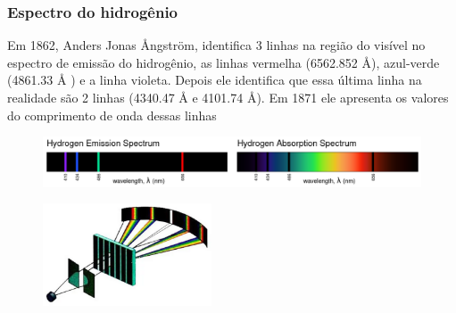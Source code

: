\documentclass[12pt,brazil]{beamer}
\begin{document}

\begin{frame}
  \frametitle{Espectro do hidrogênio}

  \begin{multicols}{2}
    \begin{minipage}[b][20ex][t]{\linewidth}
    \vspace*{0.5cm}
        \fontsize{9pt}{11pt}\selectfont
      Em 1862, Anders Jonas Ångström, identifica  3 linhas na região do visível no espectro de emissão do hidrogênio, as linhas vermelha (6562.852 Å), azul-verde (4861.33 Å ) e a linha violeta. Depois ele identifica que essa última linha na realidade são 2 linhas (4340.47 Å e 4101.74 Å). Em 1871 ele apresenta os valores do comprimento de onda dessas linhas
    \end{minipage}

    \begin{minipage}[b][20ex][t]{\linewidth}
    \vspace*{0.5cm}
      \begin{figure}
        \includegraphics[width=12cm]{figuras/fig02}
      \end{figure}
    \end{minipage}

    \begin{minipage}[b][40ex][t]{\linewidth}
    \vspace*{0.50cm}
      \begin{figure}
        \includegraphics[width=5cm]{figuras/fig01}
      \end{figure}
    \end{minipage}
  \end{multicols}
\end{frame}

\end{document}
